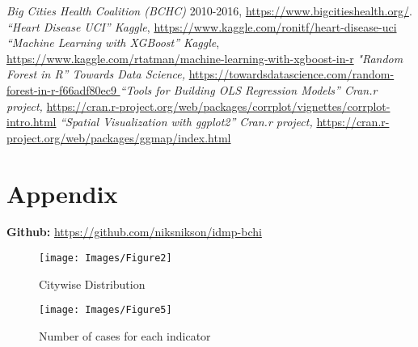 \documentclass[11pt]{article}
\begin{document}
\begin{multicols}{2}
    \begin{thebibliography}{9}
         \emph{Big Cities Health Coalition (BCHC)} 2010-2016,
        \url{https://www.bigcitieshealth.org/}. 
         \emph{“Heart Disease UCI” Kaggle},
        \url{https://www.kaggle.com/ronitf/heart-disease-uci}
         \emph{“Machine Learning with XGBoost” Kaggle},
        \url{https://www.kaggle.com/rtatman/machine-learning-with-xgboost-in-r}
         \emph{"Random Forest in R” Towards Data Science, }
        \url{ https://towardsdatascience.com/random-forest-in-r-f66adf80ec9 }
         \emph{“Tools for Building OLS Regression Models” Cran.r project,}
        \url{https://cran.r-project.org/web/packages/corrplot/vignettes/corrplot-intro.html}
         \emph{“Spatial Visualization with ggplot2” Cran.r project,}
        \url{https://cran.r-project.org/web/packages/ggmap/index.html}
    \end{thebibliography}
\end{multicols}
    
    \newpage
    \section*{Appendix}
    \textbf{ Github:} \url{https://github.com/niksnikson/idmp-bchi}

    \begin{figure}[H]
        \centering
        \texttt{[image: Images/Figure2]}
        \vspace{-10pt}
        \caption{Citywise Distribution}
    \end{figure} 

    \begin{figure}[H]
        \centering
        \texttt{[image: Images/Figure5]}
        \vspace{-10pt}
        \caption{Number of cases for each indicator}
    \end{figure} 
\end{document}
